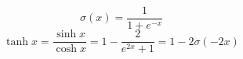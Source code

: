 \[ \sigma(x) = \frac{1}{1 + e^{-x}} \]
\[ \tanh{x} = \frac{\sinh{x}}{\cosh{x}} = 1 - \frac{2}{e^{2x} + 1} = 1 - 2 \sigma(-2x) \]


